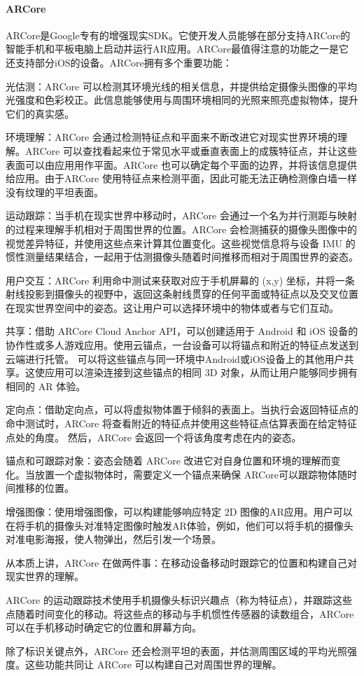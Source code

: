 \documentclass{article}
\begin{document}
\paragraph{ARCore}
ARCore是Google专有的增强现实SDK。它使开发人员能够在部分支持ARCore的智能手机和平板电脑上启动并运行AR应用。ARCore最值得注意的功能之一是它还支持部分iOS的设备。ARCore拥有多个重要功能：\par
光估测：ARCore 可以检测其环境光线的相关信息，并提供给定摄像头图像的平均光强度和色彩校正。此信息能够使用与周围环境相同的光照来照亮虚拟物体，提升它们的真实感。\par
环境理解：ARCore 会通过检测特征点和平面来不断改进它对现实世界环境的理解。ARCore 可以查找看起来位于常见水平或垂直表面上的成簇特征点，并让这些表面可以由应用用作平面。ARCore 也可以确定每个平面的边界，并将该信息提供给应用。由于ARCore 使用特征点来检测平面，因此可能无法正确检测像白墙一样没有纹理的平坦表面。\par
运动跟踪：当手机在现实世界中移动时，ARCore 会通过一个名为并行测距与映射的过程来理解手机相对于周围世界的位置。ARCore 会检测捕获的摄像头图像中的视觉差异特征，并使用这些点来计算其位置变化。这些视觉信息将与设备 IMU 的惯性测量结果结合，一起用于估测摄像头随着时间推移而相对于周围世界的姿态。\par
用户交互：ARCore 利用命中测试来获取对应于手机屏幕的 (x,y) 坐标，并将一条射线投影到摄像头的视野中，返回这条射线贯穿的任何平面或特征点以及交叉位置在现实世界空间中的姿态。这让用户可以选择环境中的物体或者与它们互动。\par
共享：借助 ARCore Cloud Anchor API，可以创建适用于 Android 和 iOS 设备的协作性或多人游戏应用。使用云锚点，一台设备可以将锚点和附近的特征点发送到云端进行托管。 可以将这些锚点与同一环境中Android或iOS设备上的其他用户共享。这使应用可以渲染连接到这些锚点的相同 3D 对象，从而让用户能够同步拥有相同的 AR 体验。\par
定向点：借助定向点，可以将虚拟物体置于倾斜的表面上。当执行会返回特征点的命中测试时，ARCore 将查看附近的特征点并使用这些特征点估算表面在给定特征点处的角度。 然后，ARCore 会返回一个将该角度考虑在内的姿态。\par
锚点和可跟踪对象：姿态会随着 ARCore 改进它对自身位置和环境的理解而变化。当放置一个虚拟物体时，需要定义一个锚点来确保 ARCore可以跟踪物体随时间推移的位置。 \par
增强图像：使用增强图像，可以构建能够响应特定 2D 图像的AR应用。用户可以在将手机的摄像头对准特定图像时触发AR体验，例如，他们可以将手机的摄像头对准电影海报，使人物弹出，然后引发一个场景。\par
从本质上讲，ARCore 在做两件事：在移动设备移动时跟踪它的位置和构建自己对现实世界的理解。\par
ARCore 的运动跟踪技术使用手机摄像头标识兴趣点（称为特征点），并跟踪这些点随着时间变化的移动。将这些点的移动与手机惯性传感器的读数组合，ARCore可以在手机移动时确定它的位置和屏幕方向。\par
除了标识关键点外，ARCore 还会检测平坦的表面，并估测周围区域的平均光照强度。这些功能共同让 ARCore 可以构建自己对周围世界的理解。\par
\end{document}
